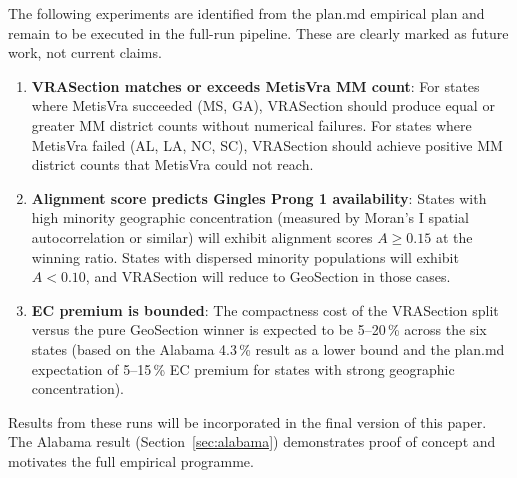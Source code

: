 The following experiments are identified from the plan.md empirical plan and
remain to be executed in the full-run pipeline.
These are clearly marked as future work, not current claims.

\begin{enumerate}
\item \textbf{VRASection matches or exceeds MetisVra MM count}: For states
  where MetisVra succeeded (MS, GA), VRASection should produce equal or
  greater MM district counts without numerical failures.
  For states where MetisVra failed (AL, LA, NC, SC), VRASection should
  achieve positive MM district counts that MetisVra could not reach.

\item \textbf{Alignment score predicts Gingles Prong 1 availability}:
  States with high minority geographic concentration (measured by
  Moran's I spatial autocorrelation or similar) will exhibit alignment
  scores $A \geq 0.15$ at the winning ratio.
  States with dispersed minority populations will exhibit $A < 0.10$,
  and VRASection will reduce to GeoSection in those cases.

\item \textbf{EC premium is bounded}: The compactness cost of the VRASection
  split versus the pure GeoSection winner is expected to be 5--20\,\% across
  the six states (based on the Alabama 4.3\,\% result as a lower bound
  and the plan.md expectation of 5--15\,\% EC premium for states with strong
  geographic concentration).
\end{enumerate}

Results from these runs will be incorporated in the final version of this paper.
The Alabama result (Section~\ref{sec:alabama}) demonstrates proof of concept
and motivates the full empirical programme.
